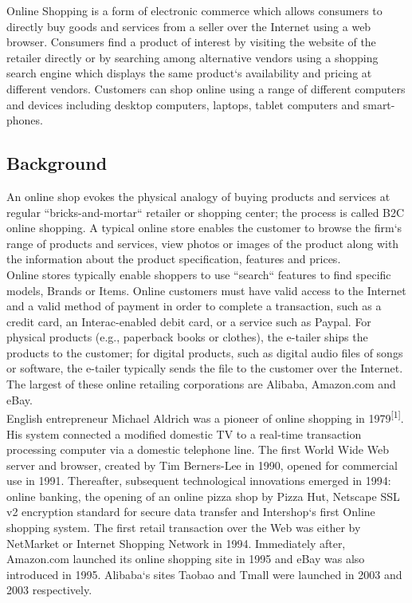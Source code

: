 \documentclass[hidelinks,a4paper,12pt]{article}
\begin{document}
Online Shopping is a form of electronic commerce which allows consumers to directly buy goods and services from a seller over the Internet using a \gls{web browser}. Consumers find a product of interest by visiting the website of the retailer directly or by searching among alternative vendors using a shopping \gls{search engine} which displays the same product`s availability and pricing at different vendors. Customers can shop online using a range of different computers and devices including desktop computers, laptops, tablet computers and smart-phones.

\subsection{Background}

An online shop evokes the physical analogy of buying products and services at regular ``bricks-and-mortar`` retailer or shopping center; the process is called \Gls{B2C} online shopping. A typical online store enables the customer to browse the firm`s range of products and services, view photos or images of the product along with the information about the product specification, features and prices.
\\

Online stores typically enable shoppers to use ``search`` features to find specific models, Brands or Items. Online customers must have valid access to the Internet and a valid method of payment in order to complete a transaction, such as a credit card, an Interac-enabled debit card, or a service such as \Gls{Paypal}. For physical products (e.g., paperback books or clothes), the e-tailer ships the products to the customer; for digital products, such as digital audio files of songs or software, the e-tailer typically sends the file to the customer over the Internet. The largest of these online retailing corporations are Alibaba, Amazon.com and eBay.
\\

English entrepreneur Michael Aldrich was a pioneer of online shopping in 1979\textsuperscript{[1]}. His system connected a modified domestic TV to a \gls{real-time transaction processing} computer  via a domestic telephone line. The first World Wide Web server and browser, created by Tim Berners-Lee in 1990, opened for commercial use in 1991. Thereafter, subsequent technological innovations emerged in 1994: online banking, the opening of an online pizza shop by Pizza Hut, Netscape \Gls{SSL} v2 encryption standard for secure data transfer and Intershop`s first  Online shopping system. The first retail transaction over the Web was either by NetMarket or Internet Shopping Network in 1994. Immediately after, Amazon.com launched its online shopping site in 1995 and eBay was also introduced in 1995. Alibaba`s sites Taobao and Tmall were launched in 2003 and 2003 respectively.
\\
\end{document}
